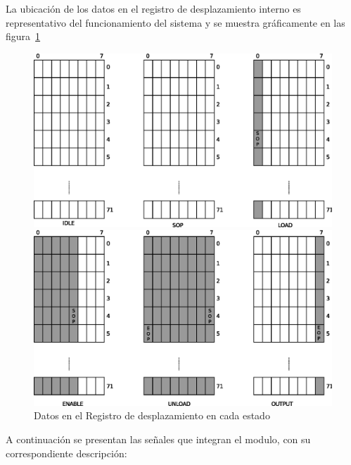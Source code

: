 La ubicación de los datos en el registro de desplazamiento interno es representativo del funcionamiento del sistema y se muestra gráficamente en las figura~\ref{fig:regdata}
\begin{figure}[H]
  \centering

	\includegraphics[scale=0.70]{3-arquitectura/graf/regdespl01.eps}


   \hspace{1\linewidth}
	\includegraphics[scale=0.70]{3-arquitectura/graf/regdespl02.eps}



  \caption{Datos en el Registro de desplazamiento en cada estado }
  \label{fig:regdata}
\end{figure}




A continuación se presentan las señales que integran el modulo, con su correspondiente descripción:

